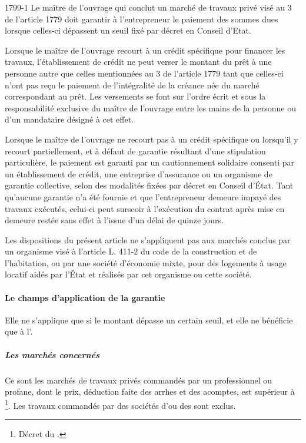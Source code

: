 				\begin{citationArticleCciv}{1799-1}
					Le maître de l'ouvrage qui conclut un marché de travaux privé visé au 3\degres{} de l'article 1779 doit garantir à l'entrepreneur le paiement des sommes dues lorsque celles-ci dépassent un seuil fixé par décret en Conseil d'Etat.
					
					Lorsque le maître de l'ouvrage recourt à un crédit spécifique pour financer les travaux, l'établissement de crédit ne peut verser le montant du prêt à une personne autre que celles mentionnées au 3\degres{}  de l'article 1779 tant que celles-ci n'ont pas reçu le paiement de l'intégralité de la créance née du marché correspondant au prêt. Les versements se font sur l'ordre écrit et sous la responsabilité exclusive du maître de l'ouvrage entre les mains de la personne ou d'un mandataire désigné à cet effet.
					
					Lorsque le maître de l'ouvrage ne recourt pas à un crédit spécifique ou lorsqu'il y recourt partiellement, et à défaut de garantie résultant d'une stipulation particulière, le paiement est garanti par un cautionnement solidaire consenti par un établissement de crédit, une entreprise d'assurance ou un organisme de garantie collective, selon des modalités fixées par décret en Conseil d'État. Tant qu'aucune garantie n'a été fournie et que l'entrepreneur demeure impayé des travaux exécutés, celui-ci peut surseoir à l'exécution du contrat après mise en demeure restée sans effet à l'issue d'un délai de quinze jours.
					
					Les dispositions du présent article ne s'appliquent pas aux marchés conclus par un organisme visé à l'article L. 411-2 du code de la construction et de l'habitation, ou par une société d'économie mixte, pour des logements à usage locatif aidés par l'État et réalisés par cet organisme ou cette société.
				\end{citationArticleCciv}
			
				\paragraph{Le champs d'application de la garantie}
				
					Elle ne s'applique que si le montant dépasse un certain seuil, et elle ne bénéficie que à l'\E.
				
					\subparagraph{Les marchés concernés} Ce sont les marchés de travaux privés commandés par un \Mo professionnel ou profane, dont le prix, déduction faite des arrhes et des acomptes, est supérieur à \footnote{Décret du .}. Les travaux commandés par des sociétés d'\HLM ou des \SEM sont exclus.
					
